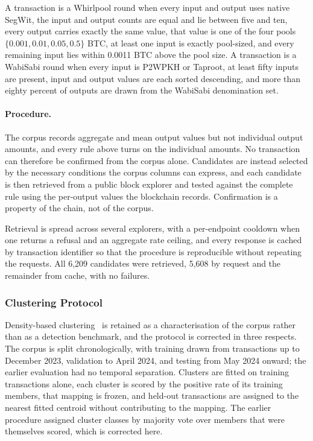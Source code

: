 \documentclass[12pt,a4paper]{article}
\begin{document}
A transaction is a Whirlpool round when every input and output
uses native SegWit, the input and output counts are equal and lie
between five and ten, every output carries exactly the same
value, that value is one of the four pools
$\{0.001, 0.01, 0.05, 0.5\}$ BTC, at least one input is exactly
pool-sized, and every remaining input lies within 0.0011 BTC
above the pool size. A transaction is a WabiSabi round when every
input is P2WPKH or Taproot, at least fifty inputs are present,
input and output values are each sorted descending, and more than
eighty percent of outputs are drawn from the WabiSabi
denomination set.

\paragraph{Procedure.}
The corpus records aggregate and mean output values but not
individual output amounts, and every rule above turns on the
individual amounts. No transaction can therefore be confirmed
from the corpus alone. Candidates are instead selected by the
necessary conditions the corpus columns can express, and each
candidate is then retrieved from a public block explorer and
tested against the complete rule using the per-output values the
blockchain records. Confirmation is a property of the chain, not
of the corpus.

Retrieval is spread across several explorers, with a per-endpoint
cooldown when one returns a refusal and an aggregate rate
ceiling, and every response is cached by transaction identifier
so that the procedure is reproducible without repeating the
requests. All 6{,}209 candidates were retrieved, 5{,}608 by
request and the remainder from cache, with no failures.

\subsubsection{Clustering Protocol}

Density-based clustering~\citep{ester1996} is retained as a
characterisation of the corpus rather
than as a detection benchmark, and the protocol is corrected in
three respects. The corpus is split chronologically, with
training drawn from transactions up to December 2023, validation
to April 2024, and testing from May 2024 onward; the earlier
evaluation had no temporal separation. Clusters are fitted on
training transactions alone, each cluster is scored by the
positive rate of its training members, that mapping is frozen,
and held-out transactions are assigned to the nearest fitted
centroid without contributing to the mapping. The earlier
procedure assigned cluster classes by majority vote over members
that were themselves scored, which is corrected here.
\end{document}
